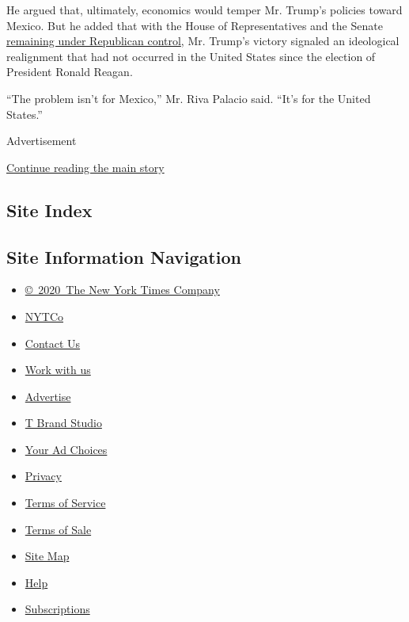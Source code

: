 He argued that, ultimately, economics would temper Mr. Trump's policies
toward Mexico. But he added that with the House of Representatives and
the Senate
\href{http://www.nytimes.com/2016/11/09/us/politics/republican-senate.html?action=Click\&contentCollection=BreakingNews\&contentID=64523551\&pgtype=article}{remaining
under Republican control}, Mr. Trump's victory signaled an ideological
realignment that had not occurred in the United States since the
election of President Ronald Reagan.

``The problem isn't for Mexico,'' Mr. Riva Palacio said. ``It's for the
United States.''

Advertisement

\protect\hyperlink{after-bottom}{Continue reading the main story}

\hypertarget{site-index}{%
\subsection{Site Index}\label{site-index}}

\hypertarget{site-information-navigation}{%
\subsection{Site Information
Navigation}\label{site-information-navigation}}

\begin{itemize}
\tightlist
\item
  \href{https://help.nytimes.com/hc/en-us/articles/115014792127-Copyright-notice}{©~2020~The
  New York Times Company}
\end{itemize}

\begin{itemize}
\tightlist
\item
  \href{https://www.nytco.com/}{NYTCo}
\item
  \href{https://help.nytimes.com/hc/en-us/articles/115015385887-Contact-Us}{Contact
  Us}
\item
  \href{https://www.nytco.com/careers/}{Work with us}
\item
  \href{https://nytmediakit.com/}{Advertise}
\item
  \href{http://www.tbrandstudio.com/}{T Brand Studio}
\item
  \href{https://www.nytimes.com/privacy/cookie-policy\#how-do-i-manage-trackers}{Your
  Ad Choices}
\item
  \href{https://www.nytimes.com/privacy}{Privacy}
\item
  \href{https://help.nytimes.com/hc/en-us/articles/115014893428-Terms-of-service}{Terms
  of Service}
\item
  \href{https://help.nytimes.com/hc/en-us/articles/115014893968-Terms-of-sale}{Terms
  of Sale}
\item
  \href{https://spiderbites.nytimes.com}{Site Map}
\item
  \href{https://help.nytimes.com/hc/en-us}{Help}
\item
  \href{https://www.nytimes.com/subscription?campaignId=37WXW}{Subscriptions}
\end{itemize}
